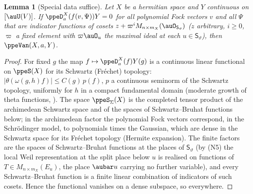 \documentclass[10pt]{amsart}
\newtheorem{lemma}[theorem]{Lemma}
\theoremstyle{definition}
\theoremstyle{remark}
\begin{document}
\begin{lemma}[Special data suffice]\label{ppe:special}
Let $X$ be a hermitian space and $Y$ continuous on $[\auU(V)]$. If $\ppeD^X_a(f(v,\Psi))Y=0$ for
all polynomial Fock vectors $v$ and all $\Psi$ that are indicator functions of cosets
$z+\varpi^i M_{n\times m_X}(\auO_{\mathsf S_\vartheta})$ ($z$ arbitrary, $i\ge0$, $\varpi$ a
fixed element with $\varpi\auO_u$ the maximal ideal at each $u\in\mathsf S_\vartheta$), then
$\ppeVan(X,a,Y)$.
\end{lemma}
\begin{proof}
For fixed $g$ the map $f\mapsto\ppeD^X_a(f)Y(g)$ is a continuous linear functional on
$\ppeS(X)$ for its Schwartz (Fr\'echet) topology: $|\theta(\omega(g,h)f)|\le C(g)\,p(f)$, $p$ a
continuous seminorm of the Schwartz topology, uniformly for $h$ in a compact fundamental
domain (moderate growth of theta functions, {\cite[Lemma~5.2]{P49}}). The space $\ppeS_\Sigma(X)$ is
the completed tensor product of the archimedean Schwartz space and of the spaces of Schwartz--Bruhat
functions below; in the archimedean factor the polynomial Fock vectors correspond, in the
Schr\"odinger model, to polynomials times the Gaussian, which are dense in the Schwartz space for its
Fr\'echet topology (Hermite expansion). The finite factors are the spaces of Schwartz--Bruhat functions at the places of $\mathsf S_\vartheta$
(by (N5) the local Weil representation at the split place below $u$ is realised on functions of
$T\in M_{n\times m_X}(E_u)$, the place $\aubar u$ carrying no further variable), and every
Schwartz--Bruhat function is a finite linear combination of indicators of such cosets. Hence the
functional vanishes on a dense subspace, so everywhere.
\end{proof}
\end{document}
